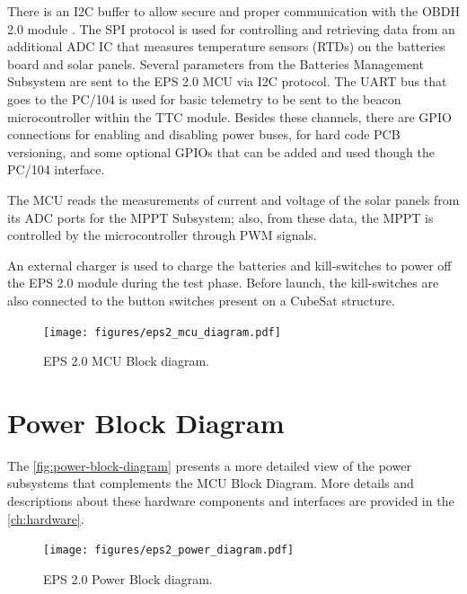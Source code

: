 There is an I2C buffer to allow secure and proper communication with the OBDH 2.0 module \cite{obdh2}.
The SPI protocol is used for controlling and retrieving data from an additional ADC IC that measures temperature sensors (RTDs) on the batteries board and solar panels.
Several parameters from the Batteries Management Subsystem are sent to the EPS 2.0 MCU via I2C protocol.
The UART bus that goes to the PC/104 is used for basic telemetry to be sent to the beacon microcontroller within the TTC module.
Besides these channels, there are GPIO connections for enabling and disabling power buses, for hard code PCB versioning, and some optional GPIOs that can be added and used though the PC/104 interface. 

The MCU reads the measurements of current and voltage of the solar panels from its ADC ports for the MPPT Subsystem; also, from these data, the MPPT is controlled by the microcontroller through PWM signals.

An external charger is used to charge the batteries and kill-switches to power off the EPS 2.0 module during the test phase. Before launch, the kill-switches are also connected to the button switches present on a CubeSat structure.   

\begin{figure}[!ht]
    \begin{center}
        \texttt{[image: figures/eps2\_mcu\_diagram.pdf]}
        \caption{EPS 2.0 MCU Block diagram.}
        \label{fig:mcu-block-diagram}
    \end{center}
\end{figure}

\section{Power Block Diagram}

The \autoref{fig:power-block-diagram} presents a more detailed view of the power subsystems that complements the MCU Block Diagram. More details and descriptions about these hardware components and interfaces are provided in the \autoref{ch:hardware}.

\begin{figure}[!ht]
    \begin{center}
        \texttt{[image: figures/eps2\_power\_diagram.pdf]}
        \caption{EPS 2.0 Power Block diagram.}
        \label{fig:power-block-diagram}
    \end{center}
\end{figure}

